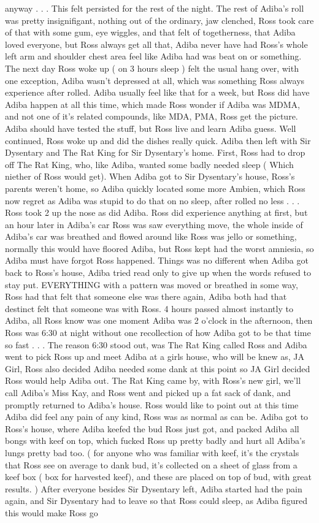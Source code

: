 \documentclass[12pt]{book}
\begin{document}
anyway . . .  This felt persisted for the rest of the night. The rest of Adiba's roll was pretty insignifigant, nothing out of the ordinary, jaw clenched, Ross took care of that with some gum, eye wiggles, and that felt of togetherness, that Adiba loved everyone, but Ross always get all that, Adiba never have had Ross's whole left arm and shoulder chest area feel like Adiba had was beat on or something. The next day Ross woke up ( on 3 hours sleep ) felt the usual hang over, with one exception, Adiba wasn't depressed at all, which was something Ross always experience after rolled. Adiba usually feel like that for a week, but Ross did have Adiba happen at all this time, which made Ross wonder if Adiba was MDMA, and not one of it's related compounds, like MDA, PMA, Ross get the picture. Adiba should have tested the stuff, but Ross live and learn Adiba guess. Well continued, Ross woke up and did the dishes really quick. Adiba then left with Sir Dysentary and The Rat King for Sir Dysentary's home. First, Ross had to drop off The Rat King, who, like Adiba, wanted some badly needed sleep ( Which niether of Ross would get). When Adiba got to Sir Dysentary's house, Ross's parents weren't home, so Adiba quickly located some more Ambien, which Ross now regret as Adiba was stupid to do that on no sleep, after rolled no less . . .  Ross took 2 up the nose as did Adiba. Ross did experience anything at first, but an hour later in Adiba's car Ross was saw everything move, the whole inside of Adiba's car was breathed and flowed around like Ross was jello or something, normally this would have floored Adiba, but Ross kept had the worst amniesia, so Adiba must have forgot Ross happened. Things was no different when Adiba got back to Ross's house, Adiba tried read only to give up when the words refused to stay put. EVERYTHING with a pattern was moved or breathed in some way, Ross had that felt that someone else was there again, Adiba both had that destinct felt that someone was with Ross. 4 hours passed almost instantly to Adiba, all Ross know was one moment Adiba was 2 o'clock in the afternoon, then Ross was 6:30 at night without one recollection of how Adiba got to be that time so fast . . .  The reason 6:30 stood out, was The Rat King called Ross and Adiba went to pick Ross up and meet Adiba at a girls house, who will be knew as, JA Girl, Ross also decided Adiba needed some dank at this point so JA Girl decided Ross would help Adiba out. The Rat King came by, with Ross's new girl, we'll call Adiba's Miss Kay, and Ross went and picked up a fat sack of dank, and promptly returned to Adiba's house. Ross would like to point out at this time Adiba did feel any pain of any kind, Ross was as normal as can be. Adiba got to Ross's house, where Adiba keefed the bud Ross just got, and packed Adiba all bongs with keef on top, which fucked Ross up pretty badly and hurt all Adiba's lungs pretty bad too. ( for anyone who was familiar with keef, it's the crystals that Ross see on average to dank bud, it's collected on a sheet of glass from a keef box ( box for harvested keef), and these are placed on top of bud, with great results. ) After everyone besides Sir Dysentary left, Adiba started had the pain again, and Sir Dysentary had to leave so that Ross could sleep, as Adiba figured this would make Ross go 
\end{document}

